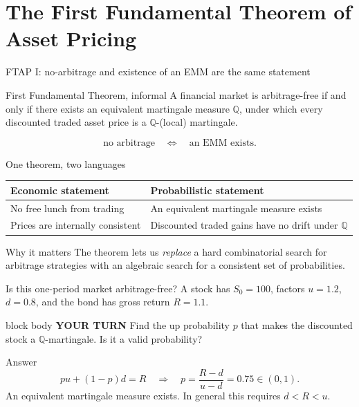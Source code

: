 \documentclass[handout,10pt,aspectratio=169]{beamer}
\newenvironment{pausebox}{\begin{beamercolorbox}[rounded=true,sep=0.8em,wd=\textwidth]{block body}
  \textbf{\color{CourseGold}YOUR TURN}\quad}{\end{beamercolorbox}}
\newcommand{\Q}{\mathbb Q}
\newcommand{\1}{\mathbf 1}
\begin{document}
\section{The First Fundamental Theorem of Asset Pricing}

\begin{frame}{FTAP I: no-arbitrage and existence of an EMM are the same statement}
\begin{block}{First Fundamental Theorem, informal}
A financial market is arbitrage-free if and only if there exists an
equivalent martingale measure \(\Q\), under which every discounted traded
asset price is a \(\Q\)-(local) martingale.
\end{block}
\[
\boxed{
\text{no arbitrage}
\quad\Longleftrightarrow\quad
\text{an EMM exists}.}
\]
\end{frame}

\begin{frame}{One theorem, two languages}
\begin{center}
\begin{tabular}{p{}p{}}
\toprule
Economic statement & Probabilistic statement\\
\midrule
No free lunch from trading & An equivalent martingale measure exists\\
Prices are internally consistent & Discounted traded gains have no drift
under \(\Q\)\\
\bottomrule
\end{tabular}
\end{center}
\begin{exampleblock}{Why it matters}
The theorem lets us \emph{replace} a hard combinatorial search for arbitrage
strategies with an algebraic search for a consistent set of probabilities.
\end{exampleblock}
\end{frame}

\begin{frame}{Is this one-period market arbitrage-free?}
A stock has \(S_0=100\), factors \(u=1.2\), \(d=0.8\), and the bond has
gross return \(R=1.1\).
\begin{pausebox}
Find the up probability \(p\) that makes the discounted stock a
\(\Q\)-martingale. Is it a valid probability?
\end{pausebox}

\begin{exampleblock}{Answer}
\[
pu+(1-p)d=R
\quad\Longrightarrow\quad
\boxed{p=\frac{R-d}{u-d}=0.75\in(0,1).}
\]
An equivalent martingale measure exists. In general this requires
\(d<R<u\).
\end{exampleblock}
\end{frame}
\end{document}
